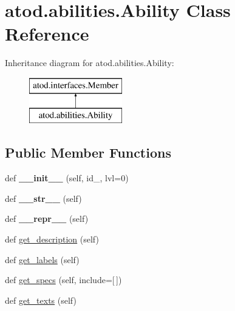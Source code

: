 \hypertarget{classatod_1_1abilities_1_1_ability}{}\section{atod.\+abilities.\+Ability Class Reference}
\label{classatod_1_1abilities_1_1_ability}
Inheritance diagram for atod.\+abilities.\+Ability\+:\begin{figure}[H]
\begin{center}
\leavevmode
\includegraphics[height=2.000000cm]{classatod_1_1abilities_1_1_ability}
\end{center}
\end{figure}
\subsection*{Public Member Functions}
\begin{DoxyCompactItemize}
\item 
def {\bfseries \+\_\+\+\_\+init\+\_\+\+\_\+} (self, id\+\_\+, lvl=0)\hypertarget{classatod_1_1abilities_1_1_ability_a651ed69d665e42eb1bef757b4e524d7f}{}\label{classatod_1_1abilities_1_1_ability_a651ed69d665e42eb1bef757b4e524d7f}

\item 
def {\bfseries \+\_\+\+\_\+str\+\_\+\+\_\+} (self)\hypertarget{classatod_1_1abilities_1_1_ability_ae1af33d0f9e9f1773d7bf8d2e58aba3f}{}\label{classatod_1_1abilities_1_1_ability_ae1af33d0f9e9f1773d7bf8d2e58aba3f}

\item 
def {\bfseries \+\_\+\+\_\+repr\+\_\+\+\_\+} (self)\hypertarget{classatod_1_1abilities_1_1_ability_adbc62b463e3aece03e5ea5148c7866c1}{}\label{classatod_1_1abilities_1_1_ability_adbc62b463e3aece03e5ea5148c7866c1}

\item 
def \hyperlink{classatod_1_1abilities_1_1_ability_a79f3dd1154fb1862d396da4bb47eca85}{get\+\_\+description} (self)
\item 
def \hyperlink{classatod_1_1abilities_1_1_ability_a991ef8299a9817642bf457f7e8dd03b3}{get\+\_\+labels} (self)
\item 
def \hyperlink{classatod_1_1abilities_1_1_ability_a95ac2238451ea94be76e532788a681a4}{get\+\_\+specs} (self, include=\mbox{[}$\,$\mbox{]})
\item 
def \hyperlink{classatod_1_1abilities_1_1_ability_a8ec6949a32f54ba31021fd710d525045}{get\+\_\+texts} (self)
\end{DoxyCompactItemize}
